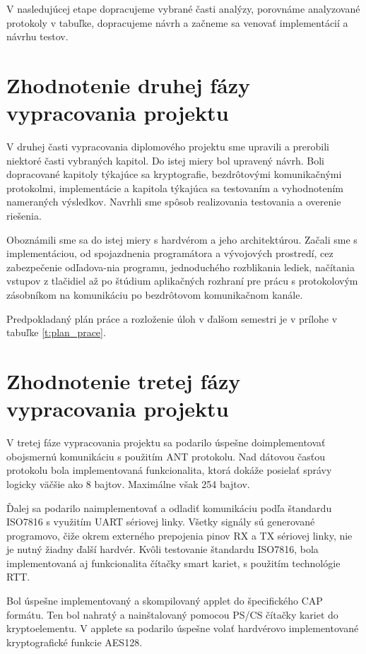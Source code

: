 \documentclass[12pt,a4paper,oneside,openright]{report}
\begin{document}
V nasledujúcej etape dopracujeme vybrané časti analýzy, porovnáme analyzované protokoly v tabuľke, dopracujeme návrh a začneme sa venovať implementácií a návrhu testov.

\section{Zhodnotenie druhej fázy vypracovania projektu}
V druhej časti vypracovania diplomového projektu sme upravili a prerobili niektoré časti vybraných kapitol. Do istej miery bol upravený návrh. Boli dopracované kapitoly týkajúce sa kryptografie, bezdrôtovými komunikačnými protokolmi, implementácie a kapitola týkajúca sa testovaním a vyhodnotením nameraných výsledkov. Navrhli sme spôsob realizovania testovania a overenie riešenia.

Oboznámili sme sa do istej miery s hardvérom a jeho architektúrou. Začali sme s implementáciou, od spojazdnenia programátora a vývojových prostredí, cez zabezpečenie odľadova-nia programu, jednoduchého rozblikania lediek, načítania vstupov z tlačidiel až po štúdium aplikačných rozhraní pre prácu s protokolovým zásobníkom na komunikáciu po bezdrôtovom komunikačnom kanále.

Predpokladaný plán práce a rozloženie úloh v ďalšom semestri je v prílohe v tabuľke \ref{t:plan_prace}.


\section{Zhodnotenie tretej fázy vypracovania projektu}
V tretej fáze vypracovania projektu sa podarilo úspešne doimplementovať obojsmernú komunikáciu s použitím ANT protokolu. Nad dátovou časťou protokolu bola implementovaná funkcionalita, ktorá dokáže posielať správy logicky väčšie ako 8 bajtov. Maximálne však 254 bajtov.

Ďalej sa podarilo naimplementovať a odladiť komunikáciu podľa štandardu ISO7816 s využitím UART sériovej linky. Všetky signály sú generované programovo, čiže okrem externého prepojenia pinov RX a TX sériovej linky, nie je nutný žiadny ďalší hardvér.
Kvôli testovanie štandardu ISO7816, bola implementovaná aj funkcionalita čítačky smart kariet, s použitím technológie RTT.

Bol úspešne implementovaný a skompilovaný applet do špecifického CAP formátu. Ten bol nahratý a nainštalovaný pomocou PS/CS čítačky kariet do kryptoelementu. V applete sa podarilo úspešne volať hardvérovo implementované kryptografické funkcie AES128.
\end{document}
